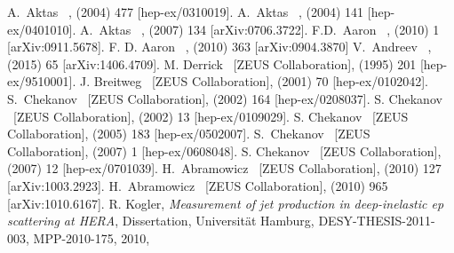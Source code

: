 \documentclass[12pt]{article}
\begin{document}
\begin{flushleft}
\begin{thebibliography}{99}
  A.~Aktas \etal\ \Hone,
   (2004) 477
  [hep-ex/0310019].
  A.~Aktas  \etal\ \Hone,
   (2004) 141
  [hep-ex/0401010].
 A.~Aktas \etal\ \Hone,  (2007) 134 [arXiv:0706.3722].
 F.D.~Aaron \etal\ \Hone,  (2010) 1 [arXiv:0911.5678].
 F. D. Aaron \etal\ \Hone,  (2010) 363 [arXiv:0904.3870]
 V.~Andreev \etal\ \Hone,  (2015) 65 [arXiv:1406.4709].
%
 M. Derrick  \etal\ [ZEUS Collaboration],  (1995) 201 [hep-ex/9510001].
 J. Breitweg \etal\ [ZEUS Collaboration],  (2001) 70 [hep-ex/0102042].
  S.~Chekanov \etal\ [ZEUS Collaboration],
   (2002) 164 [hep-ex/0208037].
 S. Chekanov \etal\ [ZEUS Collaboration],  (2002) 13 [hep-ex/0109029].
 S. Chekanov \etal\ [ZEUS Collaboration],  (2005) 183 [hep-ex/0502007].
 S.~Chekanov \etal\ [ZEUS Collaboration],
   (2007) 1 [hep-ex/0608048].
 S. Chekanov \etal\ [ZEUS Collaboration],  (2007) 12 [hep-ex/0701039].
 H.~Abramowicz \etal\ {[ZEUS Collaboration]},  (2010) 127 [arXiv:1003.2923].
 H.~Abramowicz \etal\ {[ZEUS Collaboration]},  (2010) 965 [arXiv:1010.6167].
%
  R. Kogler, \emph{Measurement of jet production in deep-inelastic ep scattering at HERA}, Dissertation, Universit\"at Hamburg, DESY-THESIS-2011-003, MPP-2010-175, 2010,

\end{thebibliography}
\end{flushleft}
\end{document}

